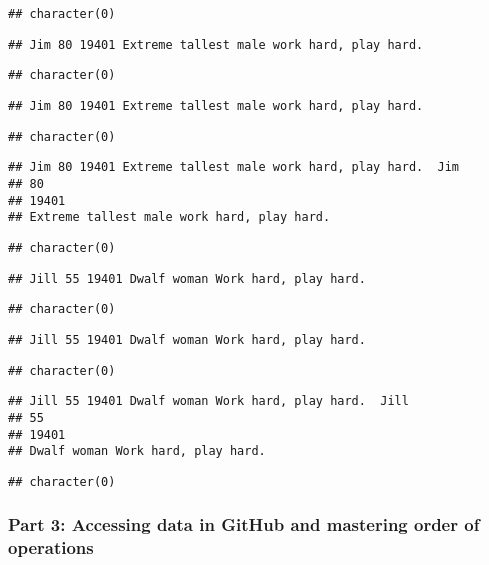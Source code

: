 \documentclass[
]{article}
\begin{document}
\begin{verbatim}
## character(0)
\end{verbatim}

\begin{verbatim}
## Jim 80 19401 Extreme tallest male work hard, play hard.
\end{verbatim}

\begin{verbatim}
## character(0)
\end{verbatim}

\begin{verbatim}
## Jim 80 19401 Extreme tallest male work hard, play hard.
\end{verbatim}

\begin{verbatim}
## character(0)
\end{verbatim}

\begin{verbatim}
## Jim 80 19401 Extreme tallest male work hard, play hard.  Jim 
## 80 
## 19401 
## Extreme tallest male work hard, play hard.
\end{verbatim}

\begin{verbatim}
## character(0)
\end{verbatim}

\begin{verbatim}
## Jill 55 19401 Dwalf woman Work hard, play hard.
\end{verbatim}

\begin{verbatim}
## character(0)
\end{verbatim}

\begin{verbatim}
## Jill 55 19401 Dwalf woman Work hard, play hard.
\end{verbatim}

\begin{verbatim}
## character(0)
\end{verbatim}

\begin{verbatim}
## Jill 55 19401 Dwalf woman Work hard, play hard.  Jill 
## 55 
## 19401 
## Dwalf woman Work hard, play hard.
\end{verbatim}

\begin{verbatim}
## character(0)
\end{verbatim}

\hypertarget{part-3-accessing-data-in-github-and-mastering-order-of-operations}{%
\subsubsection{Part 3: Accessing data in GitHub and mastering order of
operations}\label{part-3-accessing-data-in-github-and-mastering-order-of-operations}}
\end{document}
